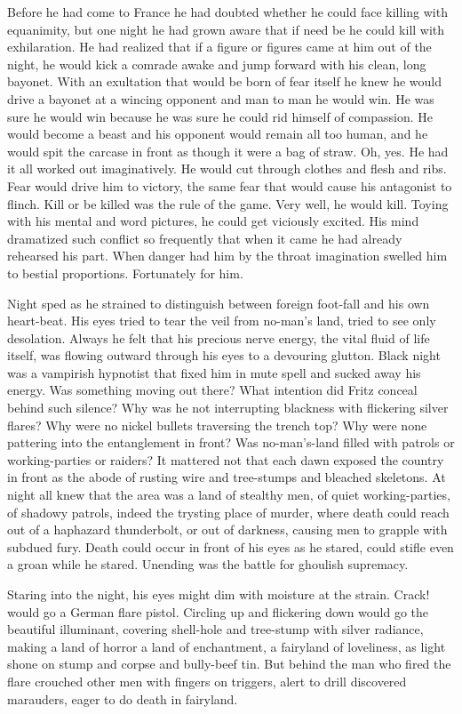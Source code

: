 Before he had come to France he had doubted whether he could face killing with equanimity, but one night he had grown aware that if need be he could kill with exhilaration. He had realized that if a figure or figures came at him out of the night, he would kick a comrade awake and jump forward with his clean, long bayonet. With an exultation that would be born of fear itself he knew he would drive a bayonet at a wincing opponent and man to man he would win. He was sure he would win because he was sure he could rid himself of compassion. He would become a beast and his opponent would remain all too human, and he would spit the carcase in front as though it were a bag of straw. Oh, yes. He had it all worked out imaginatively. He would cut through clothes and flesh and ribs. Fear would drive him to victory, the same fear that would cause his antagonist to flinch. Kill or be killed was the rule of the game. Very well, he would kill. Toying with his mental and word pictures, he could get viciously excited. His mind dramatized such conflict so frequently that when it came he had already rehearsed his part. When danger had him by the throat imagination swelled him to bestial proportions. Fortunately for him.

Night sped as he strained to distinguish between foreign foot-fall and his own heart-beat. His eyes tried to tear the veil from no-man's land, tried to see only desolation. Always he felt that his precious nerve energy, the vital fluid of life itself, was flowing outward through his eyes to a devouring glutton. Black night was a vampirish hypnotist that fixed him in mute spell and sucked away his energy. Was something moving out there? What intention did Fritz conceal behind such silence? Why was he not interrupting blackness with flickering silver flares? Why were no nickel bullets traversing the trench top? Why were none pattering into the entanglement in front? Was no-man's-land filled with patrols or working-parties or raiders? It mattered not that each dawn exposed the country in front as the abode of rusting wire and tree-stumps and bleached skeletons. At night all knew that the area was a land of stealthy men, of quiet working-parties, of shadowy patrols, indeed the trysting place of murder, where death could reach out of a haphazard thunderbolt, or out of darkness, causing men to grapple with subdued fury. Death could occur in front of his eyes as he stared, could stifle even a groan while he stared. Unending was the battle for ghoulish supremacy.

Staring into the night, his eyes might dim with moisture at the strain. Crack! would go a German flare pistol. Circling up and flickering down would go the beautiful illuminant, covering shell-hole and tree-stump with silver radiance, making a land of horror a land of enchantment, a fairyland of loveliness, as light shone on stump and corpse and bully-beef tin. But behind the man who fired the flare crouched other men with fingers on triggers, alert to drill discovered marauders, eager to do death in fairyland.

